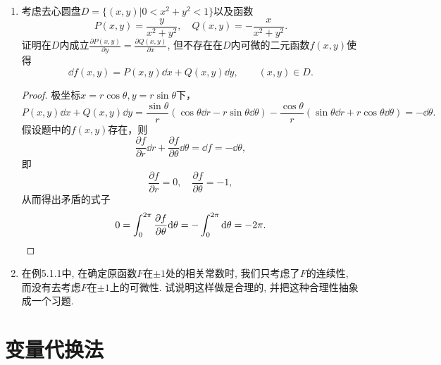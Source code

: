 \begin{1b}
\begin{enumerate}
\item 考虑去心圆盘\(D=\{(x,y)|0<x^2+y^2<1\}\)以及函数\[P(x,y)=\frac{y}{x^2+y^2},\quad Q(x,y)=-\frac{x}{x^2+y^2}.\]
证明在\(D\)内成立\(\frac{\partial P(x,y)}{\partial y}=\frac{\partial Q(x,y)}{\partial x}\), 
但不存在在\(D\)内可微的二元函数\(f(x,y)\)使得
\[\dd f(x,y)=P(x,y)\dd x+Q(x,y)\dd y,\qquad (x,y)\in D.\]
\begin{proof}
    极坐标$x=r\cos\theta,y=r\sin\theta$下，
    \[P(x,y)\dd x+Q(x,y)\dd y=\frac{\sin\theta}{r}(\cos\theta\dd r-r\sin\theta\dd\theta)
    -\frac{\cos\theta}{r}(\sin\theta\dd r+r\cos\theta\dd\theta)=-\dd\theta.\]
    假设题中的$f(x,y)$存在，则
    \[\frac{\partial f}{\partial r}\dd r+\frac{\partial f}{\partial\theta}\dd\theta
    =\dd f=-\dd\theta,\]
    即
    \[\frac{\partial f}{\partial r}=0,\quad\frac{\partial f}{\partial\theta}=-1,\]
    从而得出矛盾的式子
    \[0=\int_0^{2\pi}\frac{\partial f}{\partial\theta}\mathrm{d}\theta=-\int_0^{2\pi}\mathrm{d}\theta=-2\pi.\qedhere\]
\end{proof}
\item 在例5.1.1中, 在确定原函数\(F\)在\(\pm 1\)处的相关常数时, 
我们只考虑了\(F\)的连续性, 而没有去考虑\(F\)在\(\pm 1\)上的可微性. 
试说明这样做是合理的, 并把这种合理性抽象成一个习题.
\end{enumerate}
\end{1b}
\section{变量代换法}

